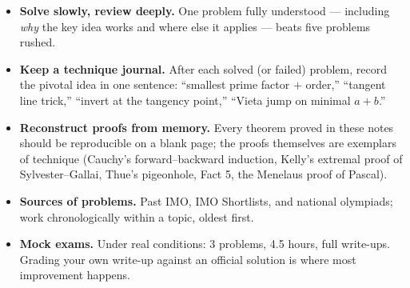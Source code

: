 \documentclass[11pt]{article}
\theoremstyle{plain}
\theoremstyle{definition}
\begin{document}
\begin{itemize}
\item \textbf{Solve slowly, review deeply.} One problem fully understood ---
including \emph{why} the key idea works and where else it applies --- beats
five problems rushed.
\item \textbf{Keep a technique journal.} After each solved (or failed)
problem, record the pivotal idea in one sentence: ``smallest prime factor $+$
order,'' ``tangent line trick,'' ``invert at the tangency point,'' ``Vieta jump on minimal $a+b$.''
\item \textbf{Reconstruct proofs from memory.} Every theorem proved in these
notes should be reproducible on a blank page; the proofs themselves are
exemplars of technique (Cauchy's forward--backward induction, Kelly's extremal proof of Sylvester--Gallai, Thue's
pigeonhole, Fact 5, the Menelaus proof of Pascal).
\item \textbf{Sources of problems.} Past IMO, IMO Shortlists, and national olympiads; work chronologically within a topic, oldest first.
\item \textbf{Mock exams.} Under real conditions: 3 problems, 4.5 hours,
full write-ups. Grading your own write-up against an official solution is
where most improvement happens.
\end{itemize}
\end{document}
